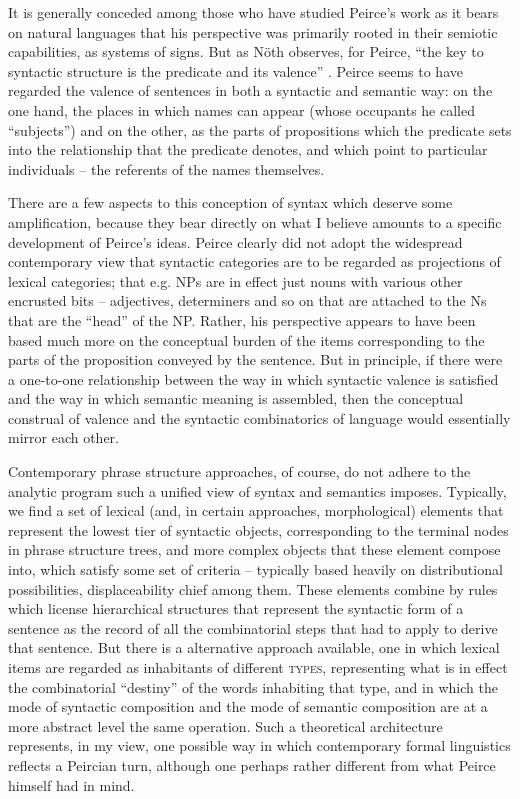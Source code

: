 \documentclass[output=paper,colorlinks,citecolor=brown]{langscibook}
\begin{document}
It is generally conceded among those who have studied Peirce's work as
it bears on natural languages that his perspective was primarily
rooted in their semiotic capabilities, as systems of signs. But as
Nöth observes, for Peirce, ``the key to syntactic structure is the
predicate and its valence'' \citeyearpar[7]{nothPeirce}. Peirce
seems to have regarded the valence of sentences in both a syntactic
and semantic way: on the one hand, the places in which names can
appear (whose occupants he called ``subjects'') and on the other, as the
parts of propositions which the predicate sets into the relationship
that the predicate denotes, and which point to particular
individuals -- the referents of the names themselves.

There are a few aspects to this conception of syntax which deserve
some amplification, because they bear directly on what I believe
amounts to a specific development of Peirce's ideas. Peirce clearly
did not adopt the widespread contemporary view that syntactic
categories are to be regarded as projections of lexical categories;
that e.g. NPs are in effect just nouns with various other encrusted
bits -- adjectives, determiners and so on that are attached to the Ns
that are the ``head'' of the NP. Rather, his perspective appears to have been
based much more on the conceptual burden of the items corresponding to
the parts of the proposition conveyed by the sentence. But in
principle, if there were a one-to-one relationship between the way in
which syntactic valence is satisfied and the way in which semantic
meaning is assembled, then the conceptual construal of valence and the
syntactic combinatorics of language would essentially mirror each
other.

Contemporary phrase structure approaches, of course, do not adhere to
the analytic program such a unified view of syntax and semantics
imposes. Typically, we find a set of lexical (and, in certain
approaches, morphological) elements that represent the lowest tier of
syntactic objects, corresponding to the terminal nodes in phrase
structure trees, and more complex objects that these element compose
into, which satisfy some set of criteria -- typically based heavily on
distributional possibilities, displaceability chief among them. These
elements combine by rules which license hierarchical structures that
represent the syntactic form of a sentence as the record of all the
combinatorial steps that had to apply to derive that sentence.  But
there is a alternative approach available, one in which lexical items
are regarded as inhabitants of different \textsc{types}, representing what
is in effect the combinatorial ``destiny'' of the words inhabiting that
type, and in which the mode of syntactic composition and the mode of
semantic composition are at a more abstract level the same
operation. Such a theoretical architecture represents, in my view, one
possible way in which contemporary formal linguistics reflects a
Peircian turn, although one perhaps rather different from what Peirce
himself had in mind.
\end{document}
